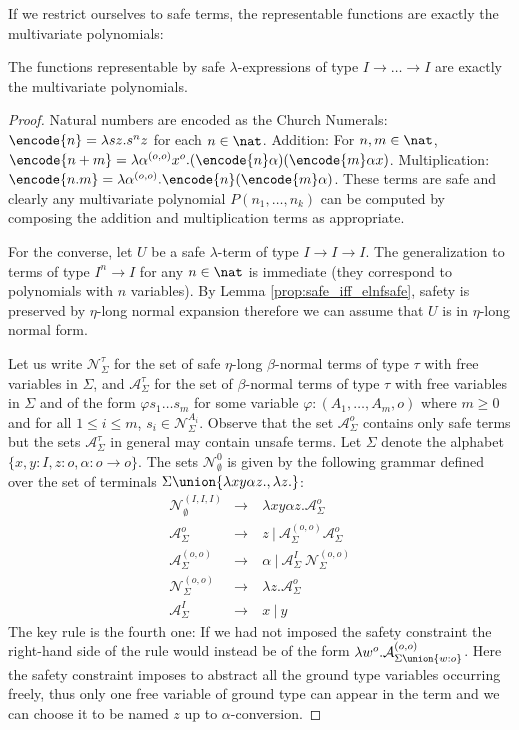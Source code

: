 If we restrict ourselves to safe terms, the representable functions
are exactly the multivariate polynomials:
\begin{theorem}
\label{thm:polychar} The functions representable by safe
$\lambda$-expressions of type $I\rightarrow \ldots \rightarrow I$
are exactly the multivariate polynomials.
\end{theorem}
\begin{proof}
  Natural numbers are encoded as the Church Numerals: $\encode{n} =
  \lambda s z. s^n z$ for each $n \in\nat$.  Addition: For $n,m \in \nat$, $\encode{n+m} =
  \lambda \alpha^{(o,o)} x^o . (\encode{n} \alpha) (\encode{m} \alpha
  x)$. Multiplication: $\encode{n . m} = \lambda \alpha^{(o,o)}
  . \encode{n} (\encode{m} \alpha)$. These terms are safe and
  clearly any multivariate polynomial $P(n_1, \ldots, n_k)$ can be
  computed by composing the addition and multiplication terms as
  appropriate.

For the converse, let $U$ be a safe $\lambda$-term of type
$I\rightarrow I\rightarrow I$.  The generalization to terms of type
$I^n \rightarrow I$ for any $n\in\nat$ is immediate (they correspond
to polynomials with $n$ variables). By Lemma
\ref{prop:safe_iff_elnfsafe}, safety is preserved by $\eta$-long
normal expansion therefore we can assume that $U$ is in $\eta$-long
normal form.

Let us write $\mathcal{N}^\tau_\Sigma$ for the set of safe
$\eta$-long $\beta$-normal terms of type $\tau$ with free variables
in $\Sigma$, and $\mathcal{A}^\tau_\Sigma$ for the set of
$\beta$-normal terms of type $\tau$ with free variables in $\Sigma$
and of the form $\varphi s_1 \ldots s_m$ for some variable
$\varphi:(A_1,\ldots,A_m,o)$ where $m\geq0$ and for all $1\leq i
\leq m$, $s_i \in \mathcal{N}^{A_i}_\Sigma$. Observe that the set
$\mathcal{A}^o_\Sigma$ contains only safe terms but the sets
$\mathcal{A}^\tau_\Sigma$ in general may contain unsafe terms. Let
$\Sigma$ denote the alphabet $\{ x, y : I, z :o, \alpha :
o\rightarrow o \}$. The sets $\mathcal{N}^0_\emptyset$ is given by
the following grammar defined over the set of terminals $\Sigma
\union \{\lambda x y \alpha z. , \lambda z. \}$:
\begin{eqnarray*}
\mathcal{N}^{(I,I,I)}_\emptyset &\rightarrow& \ \lambda x y \alpha z . \mathcal{A}^o_\Sigma \\
\mathcal{A}^o_\Sigma &\rightarrow&\ z \ | \ \mathcal{A}^{(o,o)}_\Sigma \mathcal{A}^o_\Sigma \\
\mathcal{A}^{(o,o)}_\Sigma &\rightarrow&\ \alpha \ |\ \mathcal{A}^I_\Sigma ~\mathcal{N}^{(o,o)}_\Sigma \\
\mathcal{N}^{(o,o)}_\Sigma &\rightarrow& \ \lambda z . \mathcal{A}^{o}_\Sigma \\
\mathcal{A}^I_\Sigma &\rightarrow&\ x \ |\ y
\end{eqnarray*}
The key rule is the fourth one: If we had not imposed the safety
constraint the right-hand side of the rule would instead be of the form $\lambda
w^o . \mathcal{A}^{(o,o)}_{\Sigma\union\{w:o\}}$. Here the safety
constraint imposes to abstract all the ground type variables
occurring freely, thus only one free variable of ground type can
appear in the term and we can choose it to be named $z$ up to
$\alpha$-conversion.


\end{proof}
